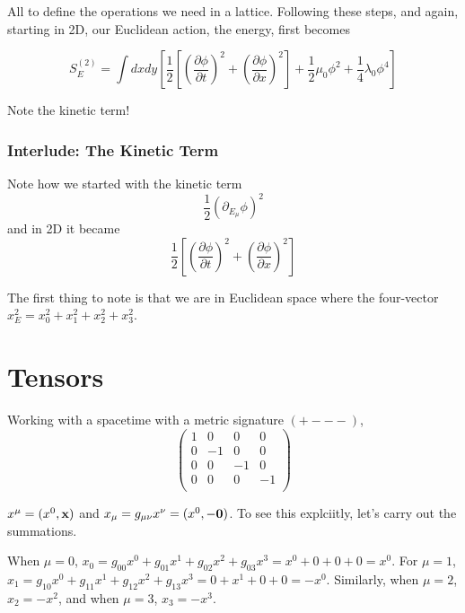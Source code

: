 All to define the operations we need in a lattice.
Following these steps, and again, starting in 2D, our Euclidean action, the energy, first becomes

$$
S_{E}^{(2)} = 
\int dx dy
\left[ 
    \frac{1}{2} \left[ \left( \frac{\partial \phi}{\partial t} \right)^2 +  \left( \frac{\partial \phi}{\partial x} \right)^2 \right] 
    + \frac{1}{2} \mu_0 \phi^2 + \frac{1}{4} \lambda_0 \phi^4
\right]
$$

Note the kinetic term!



\subsubsection{Interlude: The Kinetic Term}

Note how we started with the kinetic term
$$
\frac{1}{2} \left( \partial_{E_\mu} \phi \right)^2
$$
and in 2D it became
$$
\frac{1}{2} \left[ 
    \left( \frac{\partial \phi}{\partial t} \right)^2 +  \left( \frac{\partial \phi}{\partial x} \right)^2
\right]
$$

The first thing to note is that we are in Euclidean space where the four-vector
$x_{E}^{2} = x_{0}^{2} + x_{1}^{2} + x_{2}^{2} + x_{3}^{2}$.






\section{Tensors}

Working with a spacetime with a metric signature $(+ - - -)$,
$$
\begin{pmatrix}
    1 & 0  & 0  & 0  \\
    0 & -1 & 0  & 0  \\
    0 & 0  & -1 & 0  \\
    0 & 0  & 0  & -1 \\
\end{pmatrix}
$$

$x^\mu = (x^0, \boldsymbol{\mathbf{x}})$ and $x_\mu = g_{\mu\nu} x^\nu = (x^0, -\boldsymbol{\mathbf{0}})$.
To see this explciitly, let's carry out the summations.

When $\mu = 0$, $x_0 = g_{00}x^0 + g_{01}x^1 + g_{02}x^2 + g_{03}x^3 = x^0 + 0 + 0 +0 = x^0$.
For $\mu = 1$, $x_1 = g_{10}x^0 + g_{11}x^1 + g_{12}x^2 + g_{13}x^3 = 0 + x^1 + 0 +0 = -x^0$.
Similarly, when $\mu = 2$, $x_2 = -x^2$, and when $\mu =3$, $x_3 = -x^3$.


